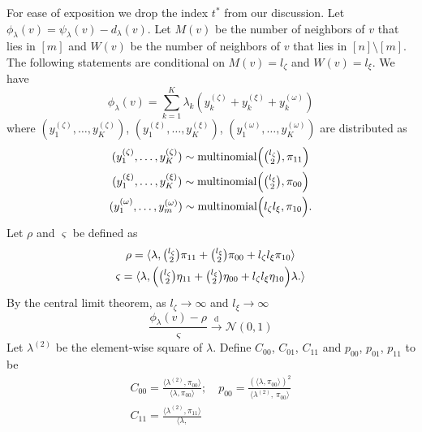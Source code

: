 \documentclass[10pt,journal,compsoc]{IEEEtran}
\theoremstyle{definition}
\begin{document}
\begin{IEEEproof}[Lemma~8]
  For ease of exposition we drop the index $t^{*}$ from our discussion. Let
  $\phi_{\lambda}(v) = \psi_{\lambda}(v) - d_{\lambda}(v)$. Let
  $M(v)$ be the number of neighbors of $v$ that lies in $[m]$ and
  $W(v)$ be the number of neighbors of $v$ that lies in $[n]
\setminus [m]$. The following statements are conditional on
$M(v) = l_{\zeta}$ and $W(v) = l_{\xi}$. We have
\begin{equation}
  \phi_{\lambda}(v) = \sum_{k=1}^{K} \lambda_k ( y^{(\zeta)}_k +
  y^{(\xi)}_k + y^{(\omega)}_k)
\end{equation}
where $(y^{(\zeta)}_1, \dots, y^{(\zeta)}_K)$, $(y^{(\xi)}_1,\dots,
 y^{(\xi)}_K)$,  $(y^{(\omega)}_1, \dots, y^{(\omega)}_K)$ are
 distributed as
\begin{gather*}
(y^{(\zeta)}_1,\dots,y^{(\zeta)}_K) \sim \textrm{multinomial}\Bigl(
\tbinom{l_\zeta}{2}, \pi_{11}\Bigr) \\ 
(y^{(\xi)}_1,\dots,y^{(\xi)}_K) \sim \textrm{multinomial}\Bigl(
\tbinom{l_\xi}{2}, \pi_{00}\Bigr) \\
(y^{(\omega)}_1,\dots,y^{(\omega)}_m) \sim \textrm{multinomial}\Bigl(
l_\zeta l_\xi, \pi_{10}\Bigr).
\end{gather*}
Let $\rho$ and $\varsigma$ be defined as
\begin{gather*}
  \rho = \langle \lambda, \tbinom{l_{\zeta}}{2} \pi_{11} +
  \tbinom{l_{\xi}}{2} \pi_{00} + l_{\zeta} l_{\xi} \pi_{10} \rangle \\
  \varsigma = \langle \lambda, \Bigl(\tbinom{l_{\zeta}}{2} \eta_{11} +
  \tbinom{l_{\xi}}{2} \eta_{00} + l_{\zeta} l_{\xi} \eta_{10}\Bigr)
  \lambda.
  \rangle
\end{gather*}
By the central limit theorem, as $l_{\zeta} \rightarrow
\infty$ and $l_{\xi} \rightarrow \infty$
\begin{equation}
  \label{eq:16}
  \frac{\phi_{\lambda}(v) - \rho}{\varsigma}  \overset{\mathrm{d}}{\longrightarrow}  \mathcal{N}(0,1)
\end{equation}
Let $\lambda^{(2)}$ be the
element-wise square of $\lambda$. Define $C_{00}$, $C_{01}$, $C_{11}$
and $p_{00}$, $p_{01}$, $p_{11}$ to be
 \begin{gather}
   \label{eq:18}
   C_{00} = \tfrac{\langle \lambda^{(2)}, \pi_{00} \rangle}{\langle \lambda,
     \pi_{00}\rangle}; \quad p_{00} = \tfrac{(\langle \lambda, \pi_{00}
     \rangle)^{2}}{\langle \lambda^{(2)},\, \pi_{00} \rangle} \\
 C_{11} = \tfrac{\langle \lambda^{(2)}, \pi_{11} \rangle}{\langle \lambda,
}
\end{gather}
\end{IEEEproof}
\end{document}
